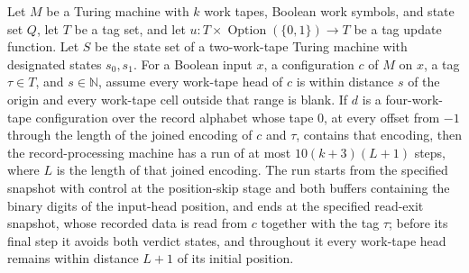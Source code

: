 \begin{theorem}
\label{Turing.recordStep_read_fields}
\leanok
{}
Let $M$ be a Turing machine with $k$ work tapes, Boolean work symbols, and state set
$Q$, let $T$ be a tag set, and let $u:T\times\operatorname{Option}(\{0,1\})\to T$ be a
tag update function. Let $S$ be the state set of a two-work-tape Turing machine with
designated states $s_0,s_1$. For a Boolean input $x$, a configuration $c$ of $M$ on $x$,
a tag $\tau\in T$, and $s\in\mathbb N$, assume every work-tape head of $c$ is within
distance $s$ of the origin and every work-tape cell outside that range is blank. If $d$
is a four-work-tape configuration over the record alphabet whose tape $0$, at every
offset from $-1$ through the length of the joined encoding of $c$ and $\tau$, contains
that encoding, then the record-processing machine has a run of at most $10(k+3)(L+1)$
steps, where $L$ is the length of that joined encoding. The run starts from the
specified snapshot with control at the position-skip stage and both buffers containing
the binary digits of the input-head position, and ends at the specified read-exit
snapshot, whose recorded data is read from $c$ together with the tag $\tau$; before its
final step it avoids both verdict states, and throughout it every work-tape head remains
within distance $L+1$ of its initial position.
\end{theorem}

